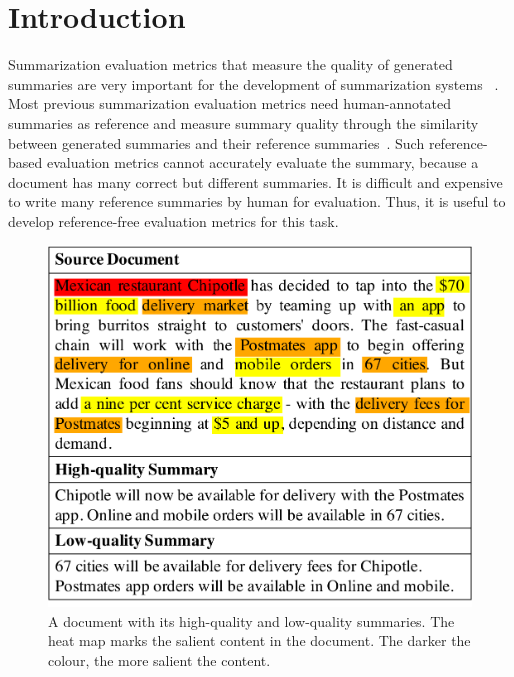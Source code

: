 \section{Introduction}
Summarization evaluation metrics that measure the quality of generated summaries are very important for the development of summarization systems
~\cite{RushCW15,ChopraAR16,NallapatiAAAI17,LiuLZ18,LiuJZ22,BART19,PEGASUS20,liu2021keyword}.
Most previous summarization evaluation metrics need human-annotated summaries as reference 
and measure summary quality through the similarity between generated summaries and their reference summaries~\cite{bleu2002,rouge,rouge2006,rouge15,bertscore,moverscore}.
Such reference-based evaluation metrics cannot accurately evaluate the summary,
because a document has many correct but different summaries.
It is difficult and expensive to write many reference summaries 
by human for evaluation. Thus, it is useful to develop 
reference-free evaluation metrics for this task. 

\begin{figure}[th]
	\centering
	\includegraphics[width=1.0\linewidth]{example1.pdf}
	\caption{A document with its high-quality and low-quality summaries. The
		heat map marks the salient content in the document.
		The darker the colour, the more salient the content.}
	\label{fig:exp}
\end{figure}

